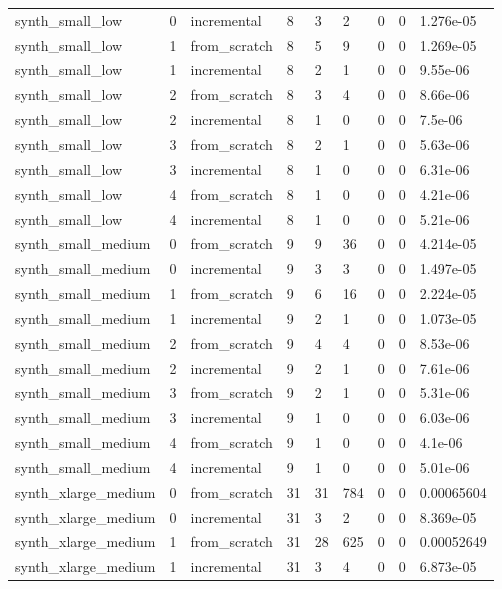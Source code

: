 \begin{table}[t]
\begin{tabular}{lllllllll}
synth\_small\_low & 0 & incremental & 8 & 3 & 2 & 0 & 0 & 1.276e-05 \\
synth\_small\_low & 1 & from\_scratch & 8 & 5 & 9 & 0 & 0 & 1.269e-05 \\
synth\_small\_low & 1 & incremental & 8 & 2 & 1 & 0 & 0 & 9.55e-06 \\
synth\_small\_low & 2 & from\_scratch & 8 & 3 & 4 & 0 & 0 & 8.66e-06 \\
synth\_small\_low & 2 & incremental & 8 & 1 & 0 & 0 & 0 & 7.5e-06 \\
synth\_small\_low & 3 & from\_scratch & 8 & 2 & 1 & 0 & 0 & 5.63e-06 \\
synth\_small\_low & 3 & incremental & 8 & 1 & 0 & 0 & 0 & 6.31e-06 \\
synth\_small\_low & 4 & from\_scratch & 8 & 1 & 0 & 0 & 0 & 4.21e-06 \\
synth\_small\_low & 4 & incremental & 8 & 1 & 0 & 0 & 0 & 5.21e-06 \\
synth\_small\_medium & 0 & from\_scratch & 9 & 9 & 36 & 0 & 0 & 4.214e-05 \\
synth\_small\_medium & 0 & incremental & 9 & 3 & 3 & 0 & 0 & 1.497e-05 \\
synth\_small\_medium & 1 & from\_scratch & 9 & 6 & 16 & 0 & 0 & 2.224e-05 \\
synth\_small\_medium & 1 & incremental & 9 & 2 & 1 & 0 & 0 & 1.073e-05 \\
synth\_small\_medium & 2 & from\_scratch & 9 & 4 & 4 & 0 & 0 & 8.53e-06 \\
synth\_small\_medium & 2 & incremental & 9 & 2 & 1 & 0 & 0 & 7.61e-06 \\
synth\_small\_medium & 3 & from\_scratch & 9 & 2 & 1 & 0 & 0 & 5.31e-06 \\
synth\_small\_medium & 3 & incremental & 9 & 1 & 0 & 0 & 0 & 6.03e-06 \\
synth\_small\_medium & 4 & from\_scratch & 9 & 1 & 0 & 0 & 0 & 4.1e-06 \\
synth\_small\_medium & 4 & incremental & 9 & 1 & 0 & 0 & 0 & 5.01e-06 \\
synth\_xlarge\_medium & 0 & from\_scratch & 31 & 31 & 784 & 0 & 0 & 0.00065604 \\
synth\_xlarge\_medium & 0 & incremental & 31 & 3 & 2 & 0 & 0 & 8.369e-05 \\
synth\_xlarge\_medium & 1 & from\_scratch & 31 & 28 & 625 & 0 & 0 & 0.00052649 \\
synth\_xlarge\_medium & 1 & incremental & 31 & 3 & 4 & 0 & 0 & 6.873e-05 \\

\end{tabular}
\end{table}
